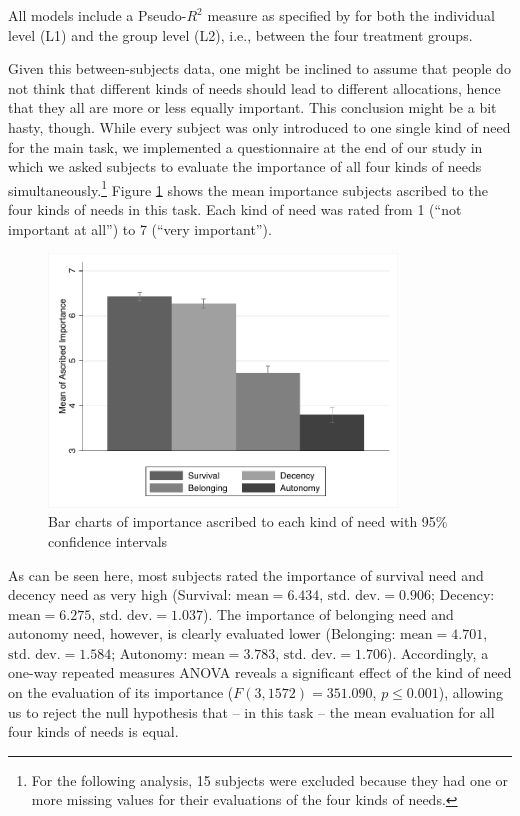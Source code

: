 \documentclass[egregdoesnotlikesansseriftitles]{scrartcl}
\begin{document}
All models include a Pseudo-$R^2$ measure as specified by \cite{snijders_modeled_1994} for both the individual level (L1) and the group level (L2), i.e., between the four treatment groups.

Given this between-subjects data, one might be inclined to assume that people do not think that different kinds of needs should lead to different allocations, hence that they all are more or less equally important.
This conclusion might be a bit hasty, though.
While every subject was only introduced to one single kind of need for the main task, we implemented a questionnaire at the end of our study in which we asked subjects to evaluate the importance of all four kinds of needs simultaneously.\footnote{For the following analysis, 15 subjects were excluded because they had one or more missing values for their evaluations of the four kinds of needs.}
Figure \ref{fig:kind_of_need_evaluation_bar} shows the mean importance subjects ascribed to the four kinds of needs in this task.
Each kind of need was rated from 1 (``not important at all'') to 7 (``very important'').

\begin{figure}[ht]
   \centering
   \includegraphics[width=25em]{figures/figure_5.pdf}
   \caption{Bar charts of importance ascribed to each kind of need with 95\% confidence intervals}
   \label{fig:kind_of_need_evaluation_bar}
\end{figure}

As can be seen here, most subjects rated the importance of survival need and decency need as very high (Survival: $\text{mean}=6.434$, $\text{std. dev.}=0.906$; Decency: $\text{mean}=6.275$, $\text{std. dev.}=1.037$).
The importance of belonging need and autonomy need, however, is clearly evaluated lower (Belonging: $\text{mean}=4.701$, $\text{std. dev.}=1.584$; Autonomy: $\text{mean}=3.783$, $\text{std. dev.}=1.706$).
Accordingly, a one-way repeated measures ANOVA reveals a significant effect of the kind of need on the evaluation of its importance ($F(3,1572)=351.090$, $p\le0.001$), allowing us to reject the null hypothesis that -- in this task -- the mean evaluation for all four kinds of needs is equal.
\end{document}
